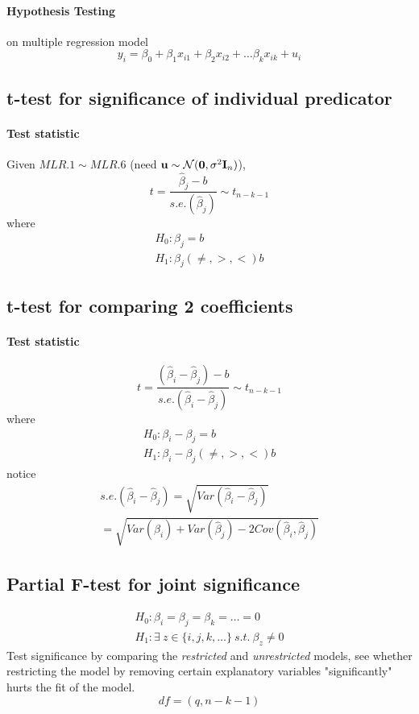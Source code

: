 \documentclass[]{article}
\begin{document}
    \paragraph{Hypothesis Testing} on multiple regression model 
    	\[
    		y_i = \beta_0 + \beta_1 x_{i1} + \beta_2 x_{i2} + \dots \beta_k x_{ik} + u_i
    	\]
    	
    	\subsection{t-test for significance of individual predicator}
    		\paragraph{Test statistic} Given $MLR.1 \sim MLR.6$ (need $\textbf{u} \sim \mathcal{{N}}(\textbf{0}, \sigma^2 \textbf{I}_n)$),
    		\[
    			t = \frac{\hat{\beta}_j - b}{s.e.(\hat{\beta}_j)} \sim t_{n-k-1}
    		\]
    		where 
    		\begin{gather*}
    			H_0: \beta_j = b \\
    			H_1: \beta_j (\neq, >, <) b
    		\end{gather*}
    	
    	
    	\subsection{t-test for comparing 2 coefficients}
    	\paragraph{Test statistic}
    	\[
    		t = \frac{(\hat{\beta}_i - \hat{\beta}_j) - b}{s.e.(\hat{\beta}_i - \hat{\beta}_j)} \sim t_{n-k-1}
    	\]
    	where 
    		\begin{gather*}
    			H_0: \beta_i - \beta_j = b \\
    			H_1: \beta_i - \beta_j (\neq, >, <) b
    		\end{gather*}
    	notice
    	\begin{gather*}
    		s.e.(\hat{\beta}_i - \hat{\beta}_j) = \sqrt{Var(\hat{\beta}_i - \hat{\beta}_j)} \\
    		= \sqrt{Var(\hat{\beta}_i) + Var(\hat{\beta}_j) - 2Cov(\hat{\beta}_i, \hat{\beta}_j)}
    	\end{gather*}
    	
    	\subsection{Partial F-test for joint significance}
    	\begin{gather*}
    		H_0: \beta_i = \beta_j = \beta_k = \dots = 0 \\
    		H_1: \exists\ z \in \{i, j, k, \dots \}\ s.t.\ \beta_z \neq 0
    	\end{gather*}
    	Test significance by comparing the \emph{restricted} and \emph{unrestricted} models, see whether restricting the model by removing certain explanatory variables "significantly" hurts the fit of the model.
    	\[
    		df = (q, n-k-1)
    	\]
\end{document}
